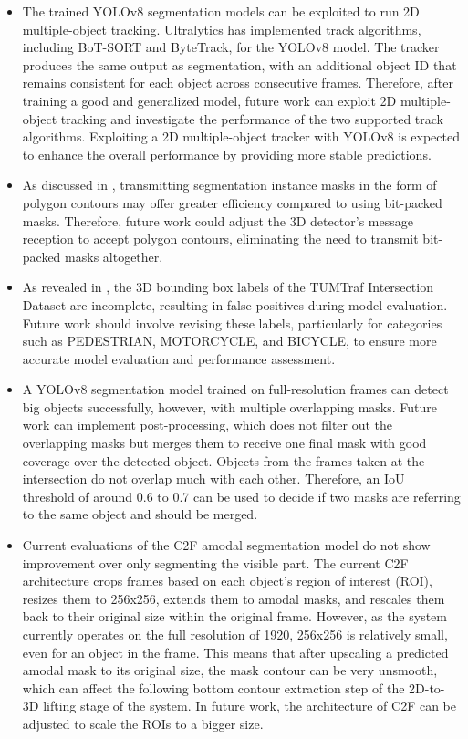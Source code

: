 \begin{itemize}
	\item The trained YOLOv8 segmentation models can be exploited to run 2D multiple-object tracking. Ultralytics has implemented track algorithms, including BoT-SORT and ByteTrack, for the YOLOv8 model. The tracker produces the same output as segmentation, with an additional object ID that remains consistent for each object across consecutive frames. Therefore, after training a good and generalized model, future work can exploit 2D multiple-object tracking and investigate the performance of the two supported track algorithms. Exploiting a 2D multiple-object tracker with YOLOv8 is expected to enhance the overall performance by providing more stable predictions.
	
	\item As discussed in , transmitting segmentation instance masks in the form of polygon contours may offer greater efficiency compared to using bit-packed masks. Therefore, future work could adjust the 3D detector's message reception to accept polygon contours, eliminating the need to transmit bit-packed masks altogether.
	
	\item As revealed in , the 3D bounding box labels of the TUMTraf Intersection Dataset are incomplete, resulting in false positives during model evaluation. Future work should involve revising these labels, particularly for categories such as PEDESTRIAN, MOTORCYCLE, and BICYCLE, to ensure more accurate model evaluation and performance assessment.
	
	\item A YOLOv8 segmentation model trained on full-resolution frames can detect big objects successfully, however, with multiple overlapping masks. Future work can implement post-processing, which does not filter out the overlapping masks but merges them to receive one final mask with good coverage over the detected object. Objects from the frames taken at the intersection do not overlap much with each other. Therefore, an IoU threshold of around 0.6 to 0.7 can be used to decide if two masks are referring to the same object and should be merged. 
	
	\item Current evaluations of the C2F amodal segmentation model do not show improvement over only segmenting the visible part. The current C2F architecture crops frames based on each object's region of interest (ROI), resizes them to 256x256, extends them to amodal masks, and rescales them back to their original size within the original frame. However, as the system currently operates on the full resolution of 1920, 256x256 is relatively small, even for an object in the frame. This means that after upscaling a predicted amodal mask to its original size, the mask contour can be very unsmooth, which can affect the following bottom contour extraction step of the 2D-to-3D lifting stage of the system. In future work, the architecture of C2F can be adjusted to scale the ROIs to a bigger size.
	
\end{itemize}